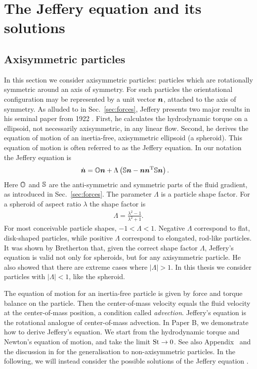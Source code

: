 \documentclass[thesis.tex]{subfiles}
\begin{document}
\section{The Jeffery equation and its solutions}

\subsection{Axisymmetric particles}

In this section we consider axisymmetric particles: particles which are rotationally symmetric around an axis of symmetry. For such particles the orientational configuration may be represented by a unit vector $\mbox{\boldmath$n$}$, attached to the axis of symmetry. As alluded to in Sec.~\ref{sec:forces}, Jeffery presents two major results in his seminal paper from 1922 \cite{jeffery1922}. First, he calculates the hydrodynamic torque on a ellipsoid, not necessarily axisymmetric, in any linear flow. Second, he derives the equation of motion of an inertia-free, axisymmetric ellipsoid (a spheroid). This equation of motion is often referred to as the Jeffery equation. In our notation the Jeffery equation is
\begin{align}
	\dot{\ve n} &= \ma O \ve n + \Lambda \left(\ma S \ve n - \ve n \ve n \transpose \ma S \ve n\right).\eqnlab{jeffery}
\end{align}
Here $\mathbb{O}$ and $\mathbb{S}$ are the anti-symmetric and symmetric parts of the fluid gradient, as introduced in Sec.~\ref{sec:forces}. The parameter $\Lambda$ is a particle shape factor. For a spheroid of aspect ratio $\lambda$ the shape factor is
\begin{align*}
	\Lambda = \frac{\lambda^2-1}{\lambda^2+1}.
\end{align*}
For most conceivable particle shapes, $-1 < \Lambda < 1$. Negative $\Lambda$ correspond to flat, disk-shaped particles, while positive $\Lambda$ correspond to elongated, rod-like particles. It was shown by Bretherton \cite{bretherton1962} that, given the correct shape factor $\Lambda$, Jeffery's equation is valid not only for spheroids, but for any axisymmetric particle. He also showed that there are extreme cases where $|\Lambda|>1$. In this thesis we consider particles with $|\Lambda|<1$, like the spheroid.

 The equation of motion for an inertia-free particle is given by force and torque balance on the particle. Then the center-of-mass velocity equals the fluid velocity at the center-of-mass position, a condition called \emph{advection}. Jeffery's equation is the rotational analogue of center-of-mass advection. In Paper B, we demonstrate how to derive Jeffery's equation. We start from the hydrodynamic torque and Newton's equation of motion, and take the limit $\mbox{St}\to 0$. See also Appendix~ and the discussion in  for the generalisation to non-axisymmetric particles. In the following, we will instead consider the possible solutions of the Jeffery equation .
\end{document}

